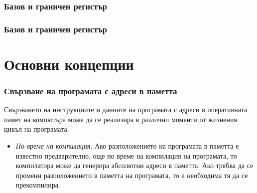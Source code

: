 \documentclass[ignorenonframetext, hyperref=unicode]{beamer}
\begin{document}
\begin{frame}
\frametitle{Базов и граничен регистър}
\begin{figure}[h]
\center
{}
\end{figure}
\end{frame}

\begin{frame}
\frametitle{Базов и граничен регистър}
\begin{figure}[h]
\center
{}
\end{figure}
\end{frame}

\section{Основни концепции}
\begin{frame}
\frametitle{Свързване на програмата с адреси в паметта}
Свързването на инструкциите и данните на програмата с адреси в оперативната
памет на компютъра може да се реализира в различни моменти от жизнения цикъл на
програмата.
\begin{itemize}
  \item {\em По време на компилация:} Ако разположението на програмата в
  паметта е известно предварително, още по време на компилация на програмата,
  то компилатора може да генерира абсолютни адреси в паметта. Ако трябва да се
  промени разположението в паметта на програмата, то е необходима тя да се
  прекомпилира.
\end{itemize}
\end{frame}
\end{document}
